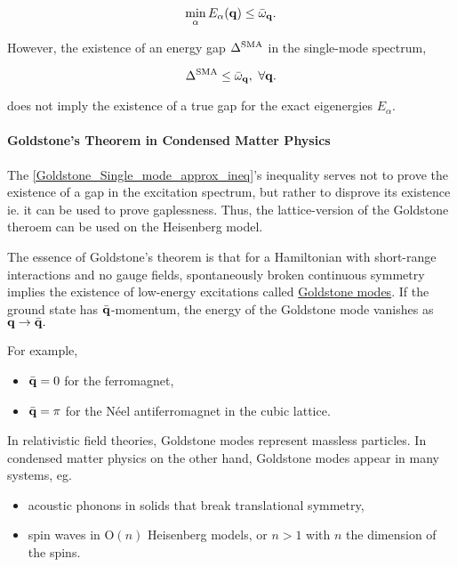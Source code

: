 \begin{equation}
    \min_{\alpha} E_{\alpha}({\bf q}) \leq \bar{\omega}_{{\bf q}}.
    \label{Goldstone_Single_mode_approx_ineq}
\end{equation}

However, the existence of an energy gap $\Delta^{\textnormal{SMA}}$ in the single-mode spectrum,

\begin{equation}
    \Delta^{\textnormal{SMA}} \leq  \bar{\omega}_{{\bf q}}, \textnormal{ } \forall {\bf q}.
\end{equation}

does not imply the existence of a true gap for the exact eigenergies $E_{\alpha}$. \\

\paragraph{\textbf{Goldstone's Theorem in Condensed Matter Physics}}

The \cref{Goldstone_Single_mode_approx_ineq}'s inequality serves not to prove the existence of a gap in the excitation spectrum, but rather to disprove its existence ie. it can be used to prove gaplessness. Thus, the lattice-version of the Goldstone theroem can be used on the Heisenberg model. \\

\begin{tcolorbox}[colback = yellow, title = Physical Context]

The essence of Goldstone's theorem is that for a Hamiltonian with short-range interactions and no gauge fields, spontaneously broken continuous symmetry implies the existence of low-energy excitations called \underline{Goldstone modes}. If the ground state has $\bar{\bf q}$-momentum, the energy of the Goldstone mode vanishes as ${\bf q} \rightarrow \bar{\bf q}.$

\begin{tcolorbox}[colback = Bittersweet, title = Example]

For example, 

\begin{itemize}
    \item $\bar{ \bf q} = 0$ for the ferromagnet, 
    \item $\bar{ \bf q} = \pi$ for the Néel antiferromagnet in the cubic lattice.
\end{itemize}

\end{tcolorbox}

In relativistic field theories, Goldstone modes represent massless particles. In condensed matter physics on the other hand, Goldstone modes appear in many systems, eg.

\begin{itemize}
    \item acoustic phonons in solids that break translational symmetry, 
    \item spin waves in O$(n)$ Heisenberg models, or $n > 1$ with $n$ the dimension of the spins. 
\end{itemize}

\end{tcolorbox}

